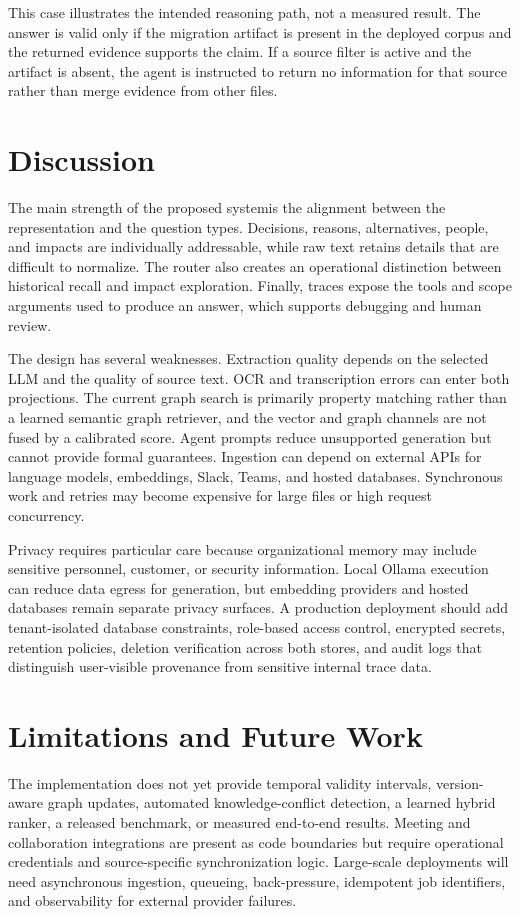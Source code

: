 \documentclass[conference]{IEEEtran}
\newcommand{\system}{the proposed system}
\begin{document}
This case illustrates the intended reasoning path, not a measured result. The answer is valid only if the migration artifact is present in the deployed corpus and the returned evidence supports the claim. If a source filter is active and the artifact is absent, the agent is instructed to return no information for that source rather than merge evidence from other files.

\section{Discussion}
The main strength of \system is the alignment between the representation and the question types. Decisions, reasons, alternatives, people, and impacts are individually addressable, while raw text retains details that are difficult to normalize. The router also creates an operational distinction between historical recall and impact exploration. Finally, traces expose the tools and scope arguments used to produce an answer, which supports debugging and human review.

The design has several weaknesses. Extraction quality depends on the selected LLM and the quality of source text. OCR and transcription errors can enter both projections. The current graph search is primarily property matching rather than a learned semantic graph retriever, and the vector and graph channels are not fused by a calibrated score. Agent prompts reduce unsupported generation but cannot provide formal guarantees. Ingestion can depend on external APIs for language models, embeddings, Slack, Teams, and hosted databases. Synchronous work and retries may become expensive for large files or high request concurrency.

Privacy requires particular care because organizational memory may include sensitive personnel, customer, or security information. Local Ollama execution can reduce data egress for generation, but embedding providers and hosted databases remain separate privacy surfaces. A production deployment should add tenant-isolated database constraints, role-based access control, encrypted secrets, retention policies, deletion verification across both stores, and audit logs that distinguish user-visible provenance from sensitive internal trace data.

\section{Limitations and Future Work}
The implementation does not yet provide temporal validity intervals, version-aware graph updates, automated knowledge-conflict detection, a learned hybrid ranker, a released benchmark, or measured end-to-end results. Meeting and collaboration integrations are present as code boundaries but require operational credentials and source-specific synchronization logic. Large-scale deployments will need asynchronous ingestion, queueing, back-pressure, idempotent job identifiers, and observability for external provider failures.
\end{document}
